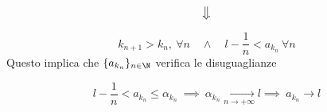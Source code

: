 \documentclass[../appunti.tex]{subfiles}
\begin{document}
\begin{dimo}
\begin{equation*}
	\big\Downarrow
\end{equation*}

\begin{equation}
	k_{n+1} > k_n, \ \forall n \quad \land \quad 
	l - \frac{1}{n} < a_{k_n}\ \forall n
\end{equation}
Questo implica che $ \{ a_{k_n} \}_{n \in \N}$ verifica le disuguaglianze

\begin{equation}
	l - \frac{1}{n} < a_{k_n} \leq \alpha_{k_n}\ \implies\ 
	\alpha_{k_n} \underset{n \to + \infty}{\to} l \implies\
	a_{k_n} \to l
\end{equation}



\end{dimo}
\end{document}
